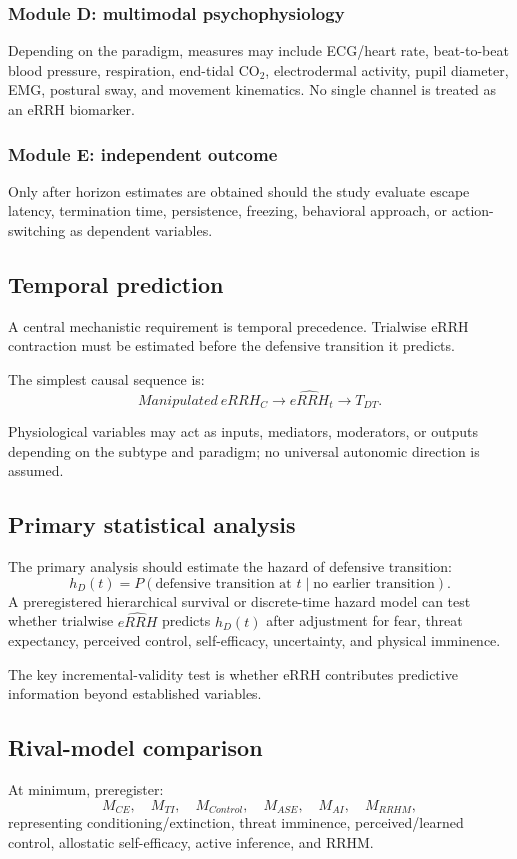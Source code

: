 \documentclass[11pt]{article}
\begin{document}
\subsubsection{Module D: multimodal psychophysiology}
Depending on the paradigm, measures may include ECG/heart rate, beat-to-beat blood pressure, respiration, end-tidal CO$_2$, electrodermal activity, pupil diameter, EMG, postural sway, and movement kinematics. No single channel is treated as an eRRH biomarker.

\subsubsection{Module E: independent outcome}
Only after horizon estimates are obtained should the study evaluate escape latency, termination time, persistence, freezing, behavioral approach, or action-switching as dependent variables.

\subsection{Temporal prediction}
A central mechanistic requirement is temporal precedence. Trialwise eRRH contraction must be estimated before the defensive transition it predicts.

The simplest causal sequence is:
\[
Manipulated\ eRRH_C
\rightarrow
\widehat{eRRH}_t
\rightarrow
T_{DT}.
\]

Physiological variables may act as inputs, mediators, moderators, or outputs depending on the subtype and paradigm; no universal autonomic direction is assumed.

\subsection{Primary statistical analysis}
The primary analysis should estimate the hazard of defensive transition:
\[
h_D(t)=P(\text{defensive transition at }t\mid\text{no earlier transition}).
\]
A preregistered hierarchical survival or discrete-time hazard model can test whether trialwise $\widehat{eRRH}$ predicts $h_D(t)$ after adjustment for fear, threat expectancy, perceived control, self-efficacy, uncertainty, and physical imminence.

The key incremental-validity test is whether eRRH contributes predictive information beyond established variables.

\subsection{Rival-model comparison}
At minimum, preregister:
\[
M_{CE},\quad M_{TI},\quad M_{Control},\quad M_{ASE},\quad M_{AI},\quad M_{RRHM},
\]
representing conditioning/extinction, threat imminence, perceived/learned control, allostatic self-efficacy, active inference, and RRHM.
\end{document}
